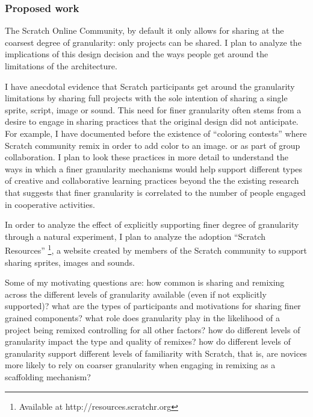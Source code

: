 \subsubsection{Proposed work}
The Scratch Online Community, by default it only allows for sharing at the coarsest degree of granularity: only projects can be shared. 
I plan to analyze the implications of this design decision and the ways  people get around the limitations of the architecture.

I have anecdotal evidence that Scratch participants get around the granularity limitations by sharing full projects with the sole intention of sharing a single sprite, script, image or sound.
This need for finer granularity often stems from a desire to engage in sharing practices that the original design did not anticipate. For example, I have documented before the existence of ``coloring contests'' \citep{nickerson_appropriation_2011} where Scratch community remix in order to add color to an image. or as part of group collaboration.
I plan to look these practices in more detail to understand the ways in which a finer granularity mechanisms would help support different types of creative and collaborative learning practices beyond the the existing research that suggests that finer granularity is correlated to the number of people engaged in cooperative activities.

In order to analyze the effect of explicitly supporting finer degree of granularity through a natural experiment, I plan to analyze the adoption ``Scratch Resources'' \footnote{Available at http://resources.scratchr.org}, a website created by members of the Scratch community to support sharing sprites, images and sounds. 

Some of my motivating questions are: 
how common is sharing and remixing across the different levels of granularity available (even if not explicitly supported)?
what are the types of participants and motivations for sharing finer grained components?
what role does granularity play in the likelihood of a project being remixed controlling for all other factors?
how do different levels of granularity impact the type and quality of remixes?
how do different levels of granularity support different levels of familiarity with Scratch, that is, are novices more likely to rely on coarser granularity when engaging in remixing as a scaffolding mechanism?

